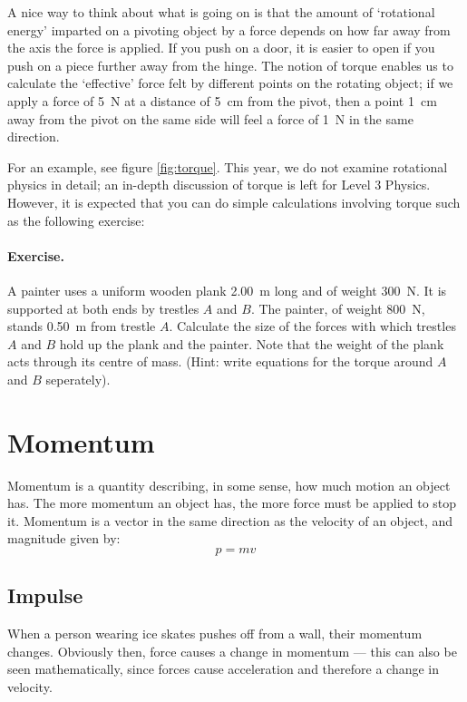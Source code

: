 \documentclass[a4paper]{amsbook}
\begin{document}
A nice way to think about what is going on is that the amount of `rotational energy' imparted on a pivoting object by a force depends on how far
away from the axis the force is applied. If you push on a door, it is easier to open if you push on a piece further away from
the hinge. The notion of torque enables us to calculate the `effective' force felt by different points on the rotating object;
if we apply a force of \SI{5}{\newton} at a distance of \SI{5}{\centi\metre} from the pivot, then a point \SI{1}{\centi\metre}
away from the pivot on the same side will feel a force of \SI{1}{\newton} in the same direction.

For an example, see figure \ref{fig:torque}. This year, we do not examine rotational physics in detail; an in-depth
discussion of torque is left for Level 3 Physics. However, it is expected that you can do simple calculations involving
torque such as the following exercise:

\paragraph{Exercise.} A painter uses a uniform wooden plank \SI{2.00}{\metre} long and of weight \SI{300}{\newton}.
It is supported at both ends by trestles $ A $ and $ B $. The painter, of weight \SI{800}{\newton}, stands \SI{0.50}{\metre}
from trestle $ A $. Calculate the size of the forces with which trestles $ A $ and $ B $ hold up the plank and the painter.
Note that the weight of the plank acts through its centre of mass. (Hint: write equations for the torque around $ A $
and $ B $ seperately).


\section{Momentum}
Momentum is a quantity describing, in some sense, how much motion an object has. The more momentum an object
has, the more force must be applied to stop it. Momentum is a vector in the same direction as the velocity of
an object, and magnitude given by:
\begin{equation}
  p = mv
\end{equation}

\subsection{Impulse}
When a person wearing ice skates pushes off from a wall, their momentum changes. Obviously then, force causes a change
in momentum --- this can also be seen mathematically, since forces cause acceleration and therefore a change in velocity.
\end{document}
